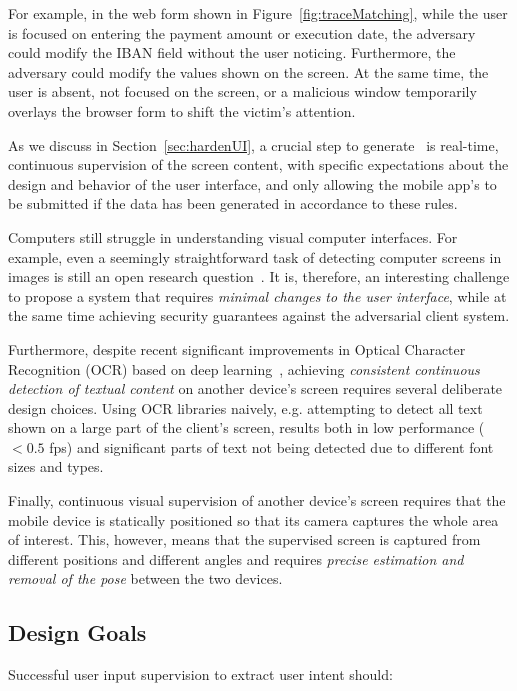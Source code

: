 For example, in the web form shown in Figure~\ref{fig:traceMatching}, while the user is focused on entering the payment amount or execution date, the adversary could modify the IBAN field without the user noticing.
Furthermore, the adversary could modify the values shown on the screen. At the same time, the user is absent, not focused on the screen, or a malicious window temporarily overlays the browser form to shift the victim's attention.

As we discuss in Section~\ref{sec:hardenUI}, a crucial step to generate \PsOI\ is real-time, continuous supervision of the screen content, with specific expectations about the design and behavior of the user interface, and only allowing the mobile app's \POI to be submitted if the data has been generated in accordance to these rules.




Computers still struggle in understanding visual computer interfaces.
For example, even a seemingly straightforward task of detecting computer screens in images is still an open research question~\cite{detectingScreens}.
It is, therefore, an interesting challenge to propose a system that requires \emph{minimal changes to the user interface}, while at the same time achieving security guarantees against the adversarial client system.

Furthermore, despite recent significant improvements in Optical Character Recognition (OCR) based on deep learning~\cite{tesseractOCR}, achieving \emph{consistent continuous detection of textual content} on another device's screen requires several deliberate design choices.
Using OCR libraries naively, e.g. attempting to detect all text shown on a large part of the client's screen, results both in low performance ($<0.5$ fps) and significant parts of text not being detected due to different font sizes and types.

Finally, continuous visual supervision of another device's screen requires that the mobile device is statically positioned so that its camera captures the whole area of interest.
This, however, means that the supervised screen is captured from different positions and different angles and requires \emph{precise estimation and removal of the pose} between the two devices.


\subsection{Design Goals}
Successful user input supervision to extract user intent should:

